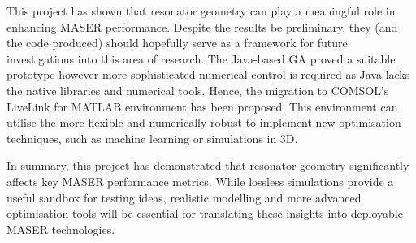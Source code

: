 This project has shown that resonator geometry can play a meaningful role in
enhancing MASER performance. Despite the results be preliminary, they (and the
code produced) should hopefully serve as a framework for future investigations
into this area of research. The Java-based GA proved a suitable prototype
however more sophisticated numerical control is required as Java lacks the
native libraries and numerical tools. Hence, the migration to COMSOL’s
LiveLink\texttrademark{} for MATLAB\textregistered{} environment has been
proposed. This environment can utilise the more flexible and numerically robust
to implement new optimisation techniques, such as machine learning or
simulations in 3D.

In summary, this project has demonstrated that resonator geometry significantly
affects key MASER performance metrics. While lossless simulations provide a
useful sandbox for testing ideas, realistic modelling and more advanced
optimisation tools will be essential for translating these insights into
deployable MASER technologies.
